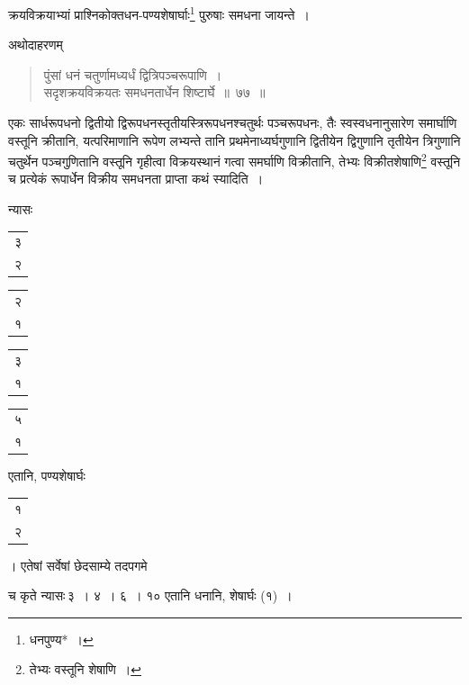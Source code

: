 \documentclass[10pt, openany]{book}
\begin{document}
{{\newpage

{क्रयविक्रयाभ्यां प्राश्निकोक्तधन-पण्यशेषार्घाः\renewcommand{\thefootnote}{\s १}\footnote{\s *धनपुण्य*~।} पुरुषाः समधना
जायन्ते~।}
\vspace{3mm}

{अथोदाहरणम्\textemdash}

\begin{quote}
    
{\eg पुंसां धनं चतुर्णामध्यर्धं द्वित्रिपञ्चरूपाणि~। \\
 सदृशक्रयविक्रयतः समधनतार्धेन शिष्टार्घे~॥~७७~॥}\end{quote}

{एकः सार्धरूपधनो द्वितीयो द्विरूपधनस्तृतीयस्त्रिरूपधनश्चतुर्थः
पञ्चरूपधनः, तैः}
{स्वस्वधनानुसारेण समार्घाणि वस्तूनि क्रीतानि, यत्परिमाणानि रूपेण
लभ्यन्ते तानि प्रथमेनाध्यर्घगुणानि द्वितीयेन द्विगुणानि तृतीयेन त्रिगुणानि चतुर्थेन
पञ्चगुणितानि वस्तूनि गृहीत्वा विक्रयस्थानं गत्वा समर्घाणि विक्रीतानि, तेभ्यः
विक्रीतशेषाणि\renewcommand{\thefootnote}{\s २}\footnote{\s तेभ्यः वस्तूनि शेषाणि~।}  वस्तूनि च प्रत्येकं}
{रूपार्धेन विक्रीय समधनता प्राप्ता कथं स्यादिति~।}
\vspace{3mm}

{न्यासः\textendash \,\begin{tabular}{r|}३\\ २\end{tabular}\begin{tabular}{r|} २\\ १\end{tabular}\begin{tabular}{r|}३\\ १\end{tabular}\begin{tabular}{r}५\\ १\end{tabular}एतानि, पण्यशेषार्घः\begin{tabular}{r}१\\ २\end{tabular}। एतेषां
सर्वेषां छेदसाम्ये तदपगमे}
{च कृते न्यासः\textendash \,३~। ४~। ६~। १० एतानि धनानि, शेषार्घः (१)~।}
\vspace{3mm}

}}
\end{document}
